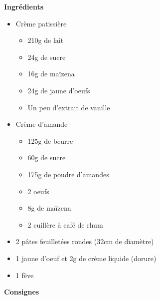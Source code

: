 \documentclass[]{book}
\providecommand{\tightlist}{%
  \setlength{\itemsep}{0pt}\setlength{\parskip}{0pt}}
\begin{document}
\textbf{Ingrédients}

\begin{itemize}
\tightlist
\item
  Crème patissière

  \begin{itemize}
  \tightlist
  \item
    210g de lait
  \item
    24g de sucre
  \item
    16g de maïzena
  \item
    24g de jaune d'oeufs
  \item
    Un peu d'extrait de vanille
  \end{itemize}
\item
  Crème d'amande

  \begin{itemize}
  \tightlist
  \item
    125g de beurre
  \item
    60g de sucre
  \item
    175g de poudre d'amandes
  \item
    2 oeufs
  \item
    8g de maïzena
  \item
    2 cuillère à café de rhum
  \end{itemize}
\item
  2 pâtes feuilletées rondes (32cm de diamètre)
\item
  1 jaune d'oeuf et 2g de crème liquide (dorure)
\item
  1 fève
\end{itemize}

\textbf{Consignes}
\end{document}
